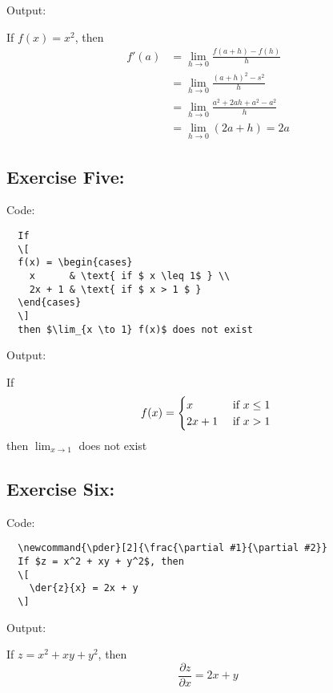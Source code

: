 \documentclass{article} %
\newcommand{\der}[2]{\frac{\mathrm{d} #1}{\mathrm{d} #2}}
\begin{document}
Output:

  If $f(x) = x^2$, then
  \begin{align*}
    f'(a) &= \lim_{h \to 0} \frac{f(a+h) - f(h)}{h} \\
          &= \lim_{h \to 0} \frac{(a + h)^2 - s^2}{h} \\
          &= \lim_{h \to 0} \frac{a^2 + 2ah + a^2 - a^2}{h} \\
          &= \lim_{h \to 0} (2a + h) = 2a
  \end{align*}

\newpage
\subsection*{Exercise Five:}
Code:
\begin{verbatim}
  If
  \[ 
  f(x) = \begin{cases}
    x      & \text{ if $ x \leq 1$ } \\
    2x + 1 & \text{ if $ x > 1 $ }
  \end{cases}
  \]
  then $\lim_{x \to 1} f(x)$ does not exist
\end{verbatim}

Output:

  If
  \[ 
  f(x) = \begin{cases}
    x      & \text{ if $ x \leq 1$ } \\
    2x + 1 & \text{ if $ x > 1 $ }
  \end{cases}
  \]
  then $\lim_{x \to 1} $ does not exist

\newpage
\subsection*{Exercise Six:}

Code:
\begin{verbatim}
  \newcommand{\pder}[2]{\frac{\partial #1}{\partial #2}}
  If $z = x^2 + xy + y^2$, then
  \[
    \der{z}{x} = 2x + y
  \]
\end{verbatim}
Output:

  \newcommand{\pder}[2]{\frac{\partial #1}{\partial #2}}
  If $z = x^2 + xy + y^2$, then
  \[
    \pder{z}{x} = 2x + y
  \]
\end{document}
